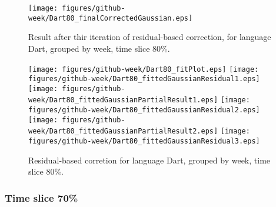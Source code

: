 \begin{figure}[]
\centering
{\texttt{[image: figures/github-week/Dart80\_finalCorrectedGaussian.eps]}}
\caption{Result after thir iteration of residual-based correction, for language Dart, grouped by week, time slice 80\%.}
\end{figure}


\begin{figure}[hb]
\centering
{}
{\texttt{[image: figures/github-week/Dart80\_fitPlot.eps]}}
{\texttt{[image: figures/github-week/Dart80\_fittedGaussianResidual1.eps]}}
{\texttt{[image: figures/github-week/Dart80\_fittedGaussianPartialResult1.eps]}}
{\texttt{[image: figures/github-week/Dart80\_fittedGaussianResidual2.eps]}}
{\texttt{[image: figures/github-week/Dart80\_fittedGaussianPartialResult2.eps]}}
{\texttt{[image: figures/github-week/Dart80\_fittedGaussianResidual3.eps]}}
\caption{Residual-based corretion for language Dart, grouped by week, time slice 80\%.}
\end{figure}


\clearpage 
\newpage 


\FloatBarrier

\subsubsection{Time slice 70\%}


